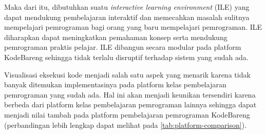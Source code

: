 Maka dari itu, dibutuhkan suatu \textit{interactive learning environment} (ILE) yang dapat mendukung pembelajaran interaktif dan memecahkan masalah sulitnya mempelajari pemrograman bagi orang yang baru mempelajari pemrograman. ILE diharapkan dapat meningkatkan pemahaman konsep serta mendukung pemrograman praktis pelajar. ILE dibangun secara modular pada platform KodeBareng sehingga tidak terlalu disruptif terhadap sistem yang sudah ada.

Visualisasi eksekusi kode menjadi salah satu aspek yang menarik karena tidak banyak ditemukan implementasinya pada platform kelas pembelajaran pemrograman yang sudah ada. Hal ini akan menjadi keunikan tersendiri karena berbeda dari platform kelas pembelajaran pemrograman lainnya sehingga dapat menjadi nilai tambah pada platform pembelajaran pemrograman KodeBareng (perbandingan lebih lengkap dapat melihat pada \autoref{tab:platform-comparison}).





